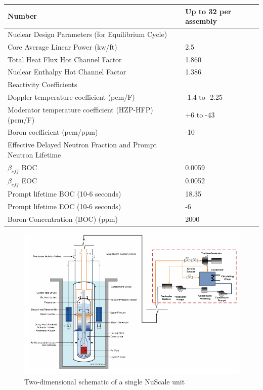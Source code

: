 \documentclass[10pt,a4paper]{article}
\begin{document}
\begin{table} [htbp]
\begin{center}
\begin{tabular}{l     l}
Number &Up to 32 per assembly\\
\hline 
Nuclear Design Parameters (for Equilibrium Cycle)\\
Core Average Linear Power (kw/ft)&2.5     \\
Total Heat Flux Hot Channel Factor&1.860  \\
Nuclear Enthalpy Hot Channel Factor&1.386  \\
\hline 
Reactivity Coefficients\\
Doppler temperature coefficient (pcm/F)&-1.4 to -2.25\\
Moderator temperature coefficient (HZP-HFP) (pcm/F)&+6 to -43     \\
Boron coefficient (pcm/ppm)&-10             \\
\hline 
Effective Delayed Neutron Fraction 
and Prompt Neutron Lifetime\\
$\beta_{eff}$ BOC&0.0059\\
$ \beta _{eff}$ EOC&0.0052\\
Prompt lifetime BOC (10-6 seconds)&18.35  \\
Prompt lifetime EOC (10-6 seconds)&-6       \\
\hline 
Boron Concentration (BOC) (ppm)&2000\\
\hline 

\end{tabular}
\end{center}
\end{table}

\begin{figure}[htbp]
\centering
\includegraphics[scale=0.7]{Figs/nuscale2d.jpeg}
\caption{ Two-dimensional schematic of a single NuScale unit}
\label{Nu2d}
\end{figure}
\end{document}
